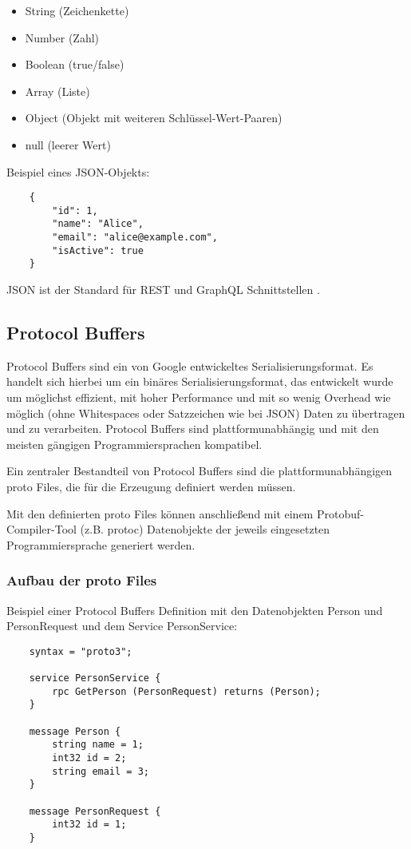 \begin{itemize}
	\item String (Zeichenkette)
	\item Number (Zahl)
	\item Boolean (true/false)
	\item Array (Liste)
	\item Object (Objekt mit weiteren Schl\"ussel-Wert-Paaren)
	\item null (leerer Wert)
\end{itemize}
\parencite{ecma404-2017}

Beispiel eines JSON-Objekts:
\begin{verbatim}
	{
		"id": 1,
		"name": "Alice",
		"email": "alice@example.com",
		"isActive": true
	}
\end{verbatim}

JSON ist der Standard für REST und GraphQL Schnittstellen \parencite{Microsoft2025,graphql-org}. 




\subsection{Protocol Buffers}
Protocol Buffers sind ein von Google entwickeltes Serialisierungsformat. Es handelt sich hierbei um ein binäres Serialisierungsformat, das entwickelt wurde um möglichst effizient, mit hoher Performance und mit so wenig Overhead wie möglich (ohne Whitespaces oder Satzzeichen wie bei JSON) Daten zu übertragen und zu verarbeiten. Protocol Buffers sind plattformunabhängig und mit den meisten gängigen Programmiersprachen kompatibel.

Ein zentraler Bestandteil von Protocol Buffers sind die plattformunabhängigen proto Files, die für die Erzeugung definiert werden müssen.

Mit den definierten proto Files können anschließend mit einem Protobuf-Compiler-Tool (z.B. protoc) Datenobjekte der jeweils eingesetzten Programmiersprache generiert werden.

\subsubsection*{Aufbau der proto Files}

Beispiel einer Protocol Buffers Definition mit den Datenobjekten Person und PersonRequest und dem Service PersonService:
\begin{verbatim}
	syntax = "proto3";
	
	service PersonService {
		rpc GetPerson (PersonRequest) returns (Person);
	}
	
	message Person {
		string name = 1;
		int32 id = 2;
		string email = 3;
	}
	
	message PersonRequest {
		int32 id = 1;
	}
\end{verbatim}

